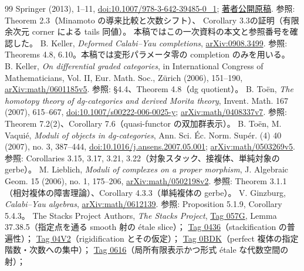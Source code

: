 \documentclass[11pt,a4paper]{ltjsarticle}
\theoremstyle{definition}\newtheorem{remark}[theorem]{注意}
\begin{document}
\begin{thebibliography}{99}
Springer (2013), 1--11,
\href{https://doi.org/10.1007/978-3-642-39485-0_1}{doi:10.1007/978-3-642-39485-0\_1};
\href{https://www-fourier.univ-grenoble-alpes.fr/~amiot/amiot.pdf}{著者公開原稿}.
参照: Theorem 2.3（Minamoto の導来比較と次数シフト）、
Corollary 3.3の証明（有限余次元 corner による tails 同値）。
本稿ではこの一次資料の本文と参照番号を確認した。
 B. Keller,
\emph{Deformed Calabi--Yau completions},
\href{https://arxiv.org/abs/0908.3499}{arXiv:0908.3499}.
参照: Theorems 4.8, 6.10。本稿では変形パラメータ零の completion のみを用いる。
 B. Keller,
\emph{On differential graded categories},
in International Congress of Mathematicians, Vol. II,
Eur. Math. Soc., Z\"urich (2006), 151--190,
\href{https://arxiv.org/abs/math/0601185}{arXiv:math/0601185v5}.
参照: \S4.4、Theorem 4.8（dg quotient）。
 B. To\"en,
\emph{The homotopy theory of dg-categories and derived Morita theory},
Invent. Math. 167 (2007), 615--667,
\href{https://doi.org/10.1007/s00222-006-0025-y}{doi:10.1007/s00222-006-0025-y};
\href{https://arxiv.org/abs/math/0408337}{arXiv:math/0408337v7}.
参照: Theorem 7.2(2)、Corollary 7.6（quasi-functor の双加群表示）。
 B. To\"en, M. Vaqui\'e,
\emph{Moduli of objects in dg-categories},
Ann. Sci. \'Ec. Norm. Sup\'er. (4) 40 (2007), no. 3, 387--444,
\href{https://doi.org/10.1016/j.ansens.2007.05.001}{doi:10.1016/j.ansens.2007.05.001};
\href{https://arxiv.org/abs/math/0503269}{arXiv:math/0503269v5}.
参照: Corollaries 3.15, 3.17, 3.21, 3.22（対象スタック、接複体、単純対象の gerbe）。
 M. Lieblich,
\emph{Moduli of complexes on a proper morphism},
J. Algebraic Geom. 15 (2006), no. 1, 175--206,
\href{https://arxiv.org/abs/math/0502198}{arXiv:math/0502198v2}.
参照: Theorem 3.1.1（相対複体の障害理論）、Corollary 4.3.3（単純複体の gerbe）。
 V. Ginzburg,
\emph{Calabi--Yau algebras},
\href{https://arxiv.org/abs/math/0612139}{arXiv:math/0612139}.
参照: Proposition 5.1.9, Corollary 5.4.3。
 The Stacks Project Authors,
\emph{The Stacks Project},
\href{https://stacks.math.columbia.edu/tag/057G}{Tag 057G},
Lemma 37.38.5（指定点を通る smooth 射の \'etale slice）；
\href{https://stacks.math.columbia.edu/tag/0436}{Tag 0436}（stackification の普遍性）；
\href{https://stacks.math.columbia.edu/tag/04V2}{Tag 04V2}（rigidification とその仮定）；
\href{https://stacks.math.columbia.edu/tag/0BDK}{Tag 0BDK}（perfect 複体の指定階数・次数への集中）；
\href{https://stacks.math.columbia.edu/tag/0616}{Tag 0616}（局所有限表示かつ形式 \'etale な代数空間の射）；

\end{thebibliography}
\end{document}
